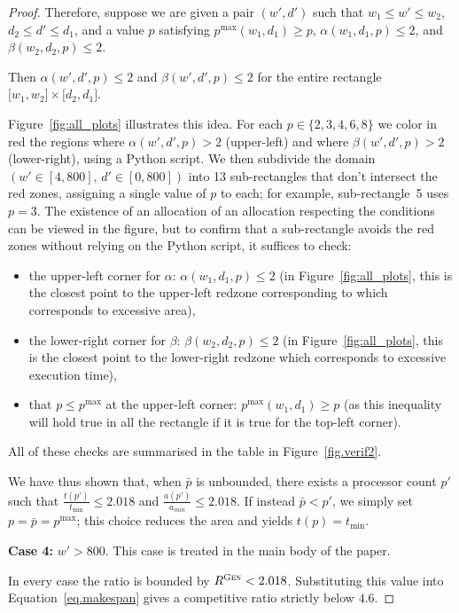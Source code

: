 \documentclass{article}
\newcommand\GEN{\textsc{Gen}\xspace}
\begin{document}
\begin{proof}
Therefore, suppose we are given a pair $(w',d')$ such that  
$w_{1}\le w'\le w_{2}$, $d_{2}\le d'\le d_{1}$, and a value $p$ satisfying  
$p^{\max}(w_{1},d_{1})\ge p$, 
$\alpha(w_{1},d_{1},p)\le2$, and $\beta(w_{2},d_{2},p)\le2$. 

Then $\alpha(w',d',p)\le2$ and $\beta(w',d',p)\le2$ for the entire rectangle
$\bigl[w_{1},w_{2}\bigr]\times\bigl[d_{2},d_{1}\bigr]$.

Figure~\ref{fig:all_plots} illustrates this idea.  
For each $p\in\{2,3,4,6,8\}$ we color in red the regions where
$\alpha(w',d',p)>2$ (upper-left) and where $\beta(w',d',p)>2$
(lower-right), using a Python script.  
We then subdivide the domain $(w'\in[4,800],\,d'\in[0,800])$ into
13 sub-rectangles that don't intersect the red zones, assigning a single value of $p$ to each; for example,
sub-rectangle~5 uses $p=3$.  
The existence of an allocation of an allocation respecting the conditions can be viewed in the figure, but to confirm that a sub-rectangle avoids the red zones without relying on the Python script, it suffices to check:
\begin{itemize}
    \item the upper-left corner for $\alpha$: $\alpha(w_{1},d_{1},p)\le2$ (in Figure~\ref{fig:all_plots}, this is the closest point to the upper-left redzone corresponding to  which corresponds to excessive area),
    \item the lower-right corner for $\beta$: $\beta(w_{2},d_{2},p)\le2$ (in Figure~\ref{fig:all_plots}, this is the closest point to the lower-right redzone which corresponds to excessive execution time),
    \item that $p \le p^{\max}$ at the upper-left corner: $p^{\max}(w_{1},d_{1})\ge p$ (as this inequality will hold true in all the rectangle if it is true for the top-left corner).
\end{itemize}


All of these checks are summarised in the table in
Figure~\ref{fig.verif2}.

\medskip
We have thus shown that, when $\bar{p}$ is unbounded, there exists a
processor count $p'$ such that
\(\tfrac{t(p')}{t_{\min}}\le2.018\) and
\(\tfrac{a(p')}{a_{min}}\le2.018\).
If instead $\bar{p}<p'$, we simply set $p=\bar{p}=p^{\max}$; this choice
reduces the area and yields $t(p)=t_{\min}$.

\textbf{Case 4:} $w'>800$.  
This case is treated in the main body of the paper.

\medskip
In every case the ratio is bounded by $R^{\GEN}<2.018$.
Substituting this value into Equation~\eqref{eq.makespan}
gives a competitive ratio strictly below $4.6$.
\end{proof}
\end{document}
